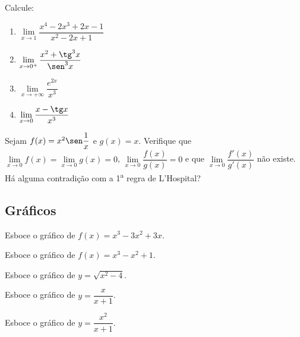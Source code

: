 \begin{exercicio}[3]
Calcule:
\begin{enumerate}[label=\alph*)]
    \item $\lim\limits_{x \to 1} \dfrac{x^4 - 2x^3 + 2x - 1}{x^2 - 2x + 1}$
    \item $\lim\limits_{x \to 0^+} \dfrac{x^2 + \tg^3 x}{\sen^3 x}$
    \item $\lim\limits_{x \to +\infty} \dfrac{e^{2x}}{x^3}$
    \item $\lim\limits_{x \to 0} \dfrac{x - \tg x}{x^3}$
\end{enumerate}
\end{exercicio}

\begin{exercicio}[4]
Sejam $f(x) = x^2 \sen\dfrac{1}{x}$ e $g(x) = x$. Verifique que $\lim\limits_{x \to 0} f(x) = \lim\limits_{x \to 0} g(x) = 0$, $\lim\limits_{x \to 0} \dfrac{f(x)}{g(x)} = 0$ e que $\lim\limits_{x \to 0} \dfrac{f'(x)}{g'(x)}$ não existe. Há alguma contradição com a 1\textsuperscript{a} regra de L'Hospital?
\end{exercicio}

\clearpage

\subsection{Gráficos}

\begin{exercicio}[1]
Esboce o gráfico de $f(x) = x^3 - 3x^2 + 3x$.
\end{exercicio}

\begin{exercicio}[2]
Esboce o gráfico de $f(x) = x^3 - x^2 + 1$.
\end{exercicio}

\begin{exercicio}[3]
Esboce o gráfico de $y = \sqrt{x^2 - 4}$.
\end{exercicio}

\begin{exercicio}[4]
Esboce o gráfico de $y = \dfrac{x}{x + 1}$.
\end{exercicio}

\begin{exercicio}[5]
Esboce o gráfico de $y = \dfrac{x^2}{x + 1}$.
\end{exercicio}

